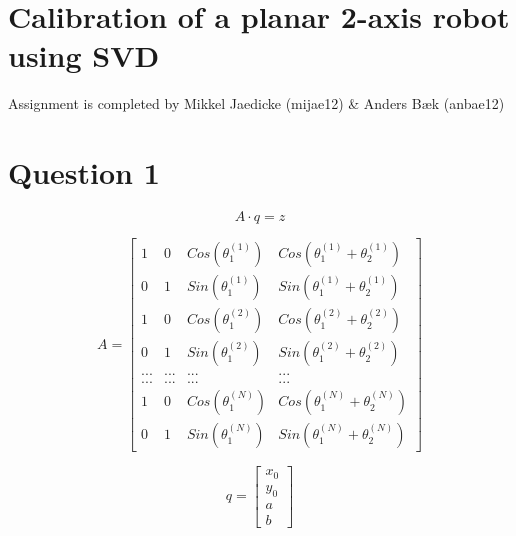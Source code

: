 \section*{Calibration of a planar 2-axis robot using SVD}
Assignment is completed by Mikkel Jaedicke (mijae12) \& Anders Bæk (anbae12)
\section*{Question 1}

\begin{equation}
A\cdot q=z
\label{eq:} 
\end{equation}



\begin{equation}
A=\begin{bmatrix} 1 & 0 & Cos\left( { \theta  }_{ 1 }^{ \left( 1 \right)  } \right)  & Cos\left( { \theta  }_{ 1 }^{ \left( 1 \right)  }+{ \theta  }_{ 2 }^{ \left( 1 \right)  } \right)  \\ 0 & 1 & Sin\left( { \theta  }_{ 1 }^{ \left( 1 \right)  } \right)  & Sin\left( { \theta  }_{ 1 }^{ \left( 1 \right)  }+{ \theta  }_{ 2 }^{ \left( 1 \right)  } \right)  \\ 1 & 0 & Cos\left( { \theta  }_{ 1 }^{ \left( 2 \right)  } \right)  & Cos\left( { \theta  }_{ 1 }^{ \left( 2 \right)  }+{ \theta  }_{ 2 }^{ \left( 2 \right)  } \right)  \\ 0 & 1 & Sin\left( { \theta  }_{ 1 }^{ \left( 2 \right)  } \right)  & Sin\left( { \theta  }_{ 1 }^{ \left( 2 \right)  }+{ \theta  }_{ 2 }^{ \left( 2 \right)  } \right)  \\ ... & ... & ... & ... \\ ... & ... & ... & ... \\ 1 & 0 & Cos\left( { \theta  }_{ 1 }^{ \left( N \right)  } \right)  & Cos\left( { \theta  }_{ 1 }^{ \left( N \right)  }+{ \theta  }_{ 2 }^{ \left( N \right)  } \right)  \\ 0 & 1 & Sin\left( { \theta  }_{ 1 }^{ \left( N \right)  } \right)  & Sin\left( { \theta  }_{ 1 }^{ \left( N \right)  }+{ \theta  }_{ 2 }^{ \left( N \right)  } \right)  \end{bmatrix}
\label{eq:} 
\end{equation}

\begin{equation}
q=\begin{bmatrix} { x }_{ 0 } \\ { y }_{ 0 } \\ a \\ b \end{bmatrix}
\label{eq:} 
\end{equation}

